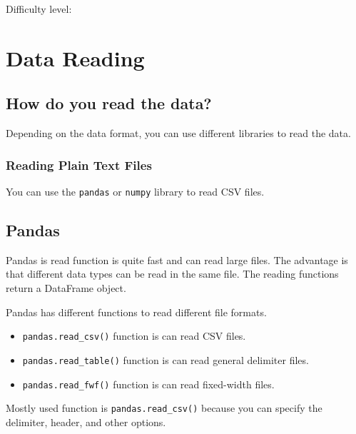 \documentclass[
  letterpaper,
  DIV=11,
  numbers=noendperiod]{scrreprt}
\begin{document}
Difficulty level: { }

\chapter*{Data Reading}\label{data-reading}


\section*{How do you read the data?}\label{how-do-you-read-the-data}


Depending on the data format, you can use different libraries to read
the data.

\subsection*{Reading Plain Text Files}\label{reading-plain-text-files}

You can use the \texttt{pandas} or \texttt{numpy} library to read CSV
files.

\section*{Pandas}\label{pandas-1}


Pandas is read function is quite fast and can read large files. The
advantage is that different data types can be read in the same file. The
reading functions return a DataFrame object.

Pandas has different functions to read different file formats.

\begin{itemize}
\item
  \texttt{pandas.read\_csv()} function is can read CSV files.
\item
  \texttt{pandas.read\_table()} function is can read general delimiter
  files.
\item
  \texttt{pandas.read\_fwf()} function is can read fixed-width files.
\end{itemize}

Mostly used function is \texttt{pandas.read\_csv()} because you can
specify the delimiter, header, and other options.
\end{document}
